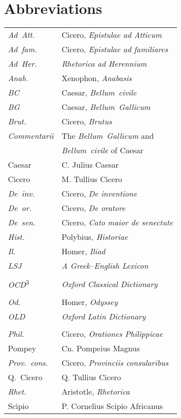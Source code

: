 \documentclass[12pt,letterpaper,oneside,final]{memoir}
\begin{document}
\chapter{Abbreviations}
\SingleSpacing
\begin{longtable}{ll}
\emph{Ad~Att.} & Cicero, \emph{Epistulae ad Atticum}\\
\emph{Ad~fam.} & Cicero, \emph{Epistulae ad familiares}\\
\emph{Ad~Her.} & \emph{Rhetorica ad Herennium}\\
\emph{Anab.} & Xenophon, \emph{Anabasis}\\
\emph{BC} & Caesar, \emph{Bellum~civile} \\
\emph{BG} & Caesar, \emph{Bellum~Gallicum} \\
\emph{Brut.} & Cicero, \emph{Brutus} \\
\emph{Commentarii} & The \emph{Bellum~Gallicum} and \\
 & \emph{Bellum~civile} of Caesar\\
Caesar & C. Julius Caesar \\
Cicero & M. Tullius Cicero\\
\emph{De~inv.} & Cicero, \emph{De inventione}\\
\emph{De~or.} & Cicero, \emph{De oratore} \\
\emph{De~sen.} & Cicero, \emph{Cato maior de senectute}\\
\emph{Hist.} & Polybius, \emph{Historiae} \\
\emph{Il.} & Homer, \emph{Iliad} \\
\emph{LSJ} & \emph{A Greek--English Lexicon} \\
 & \parencite{lsj1996} \\
\emph{OCD}\textsuperscript{3} & \emph{Oxford Classical Dictionary} \\
 & \parencite{ocd3}\\
\emph{Od.} & Homer, \emph{Odyssey} \\
\emph{OLD} & \emph{Oxford Latin Dictionary} \\
 & \parencite{old} \\
\emph{Phil.} & Cicero, \emph{Orationes Philippicae}\\
Pompey & Cn. Pompeius Magnus \\
\emph{Prov.~cons.} & Cicero, \emph{Provinciis consularibus}\\
Q.~Cicero & Q. Tullius Cicero\\
\emph{Rhet.} & Aristotle, \emph{Rhetorica}\\
Scipio & P. Cornelius Scipio Africanus\\
\end{longtable}
\end{document}
